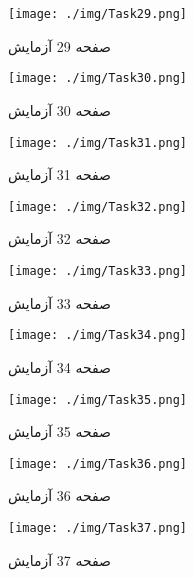  
\begin{figure}[htpb]
\centering
\texttt{[image: ./img/Task29.png]}
\caption{ صفحه 29 آزمایش }
\label{fig:Task29}
\end{figure}
 
 
\begin{figure}[htpb]
\centering
\texttt{[image: ./img/Task30.png]}
\caption{ صفحه 30 آزمایش }
\label{fig:Task30}
\end{figure}
 
 
\begin{figure}[htpb]
\centering
\texttt{[image: ./img/Task31.png]}
\caption{ صفحه 31 آزمایش }
\label{fig:Task31}
\end{figure}
 
 
\begin{figure}[htpb]
\centering
\texttt{[image: ./img/Task32.png]}
\caption{ صفحه 32 آزمایش }
\label{fig:Task32}
\end{figure}
 
 
\begin{figure}[htpb]
\centering
\texttt{[image: ./img/Task33.png]}
\caption{ صفحه 33 آزمایش }
\label{fig:Task33}
\end{figure}
 
 
\begin{figure}[htpb]
\centering
\texttt{[image: ./img/Task34.png]}
\caption{ صفحه 34 آزمایش }
\label{fig:Task34}
\end{figure}
 
 
\begin{figure}[htpb]
\centering
\texttt{[image: ./img/Task35.png]}
\caption{ صفحه 35 آزمایش }
\label{fig:Task35}
\end{figure}
 
 
\begin{figure}[htpb]
\centering
\texttt{[image: ./img/Task36.png]}
\caption{ صفحه 36 آزمایش }
\label{fig:Task36}
\end{figure}
 
 
\begin{figure}[htpb]
\centering
\texttt{[image: ./img/Task37.png]}
\caption{ صفحه 37 آزمایش }
\label{fig:Task37}
\end{figure}
 
